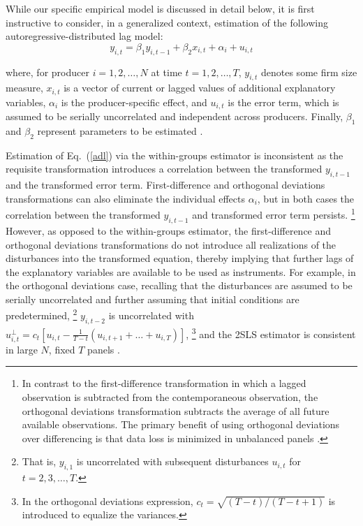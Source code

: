\documentclass[english]{article}
\begin{document}
While our specific empirical model is discussed in detail below, it is first 
instructive to consider, in a generalized context, estimation of the following 
autoregressive-distributed lag model: 
\begin{equation}
y_{i,t} = \beta_1 y_{i,t-1} + \beta_2 x_{i,t} + \alpha_i +  u_{i,t}
\label{adl}
\end{equation}

\noindent
where, for producer $i=1,2,\ldots,N$ at time $t=1,2,\ldots,T$, $y_{i,t}$ 
denotes some firm size measure, $x_{i,t}$ is a vector of current or lagged 
values of additional explanatory variables, $\alpha_i$ is the producer-specific 
effect, and $u_{i,t}$ is the error term, which is assumed to be serially 
uncorrelated and independent across producers. 
Finally, $\beta_1$ and $\beta_2$ represent parameters to be estimated
\citep{bond2002}.

Estimation of Eq.\ (\ref{adl}) via the within-groups estimator is 
inconsistent as the requisite transformation introduces a correlation between 
the transformed $y_{i,t-1}$ and the transformed error term. 
First-difference and orthogonal deviations transformations can also eliminate 
the individual effects $\alpha_i$, but in both cases the correlation between the 
transformed $y_{i,t-1}$ and transformed error term persists.%
\footnote{In contrast to the first-difference transformation in which a lagged 
observation is subtracted from the contemporaneous observation, the 
orthogonal deviations transformation subtracts the average of all future 
available observations. 
The primary benefit of using orthogonal deviations over differencing is that 
data loss is minimized in unbalanced panels \citep{arellano1995}.} 
However, as opposed to the within-groups estimator, the first-difference and 
orthogonal deviations transformations do not introduce all realizations of the 
disturbances into the transformed equation, thereby implying that further lags 
of the explanatory variables are available to be used as instruments. 
For example, in the orthogonal deviations case, recalling that the disturbances 
are assumed to be serially uncorrelated and further assuming that initial 
conditions are predetermined,%
\footnote{That is, $y_{i,1}$ is uncorrelated with subsequent disturbances 
$u_{i,t}$ for $t=2,3,\ldots,T$.} 
$y_{i,t-2}$ is uncorrelated with $u_{i,t}^{\perp} = c_t\left[u_{i,t} - 
\frac{1}{T - t }\left(u_{i,t + 1} + \ldots + u_{i,T} \right) \right]$,%
\footnote{In the orthogonal deviations expression, $c_t = 
\sqrt{(T - t)/(T - t + 1)}$ is introduced to equalize the variances.} 
and the 2SLS estimator is consistent in large $N$, fixed $T$ panels 
\citep{anderson1982, arellano1995, bond2002, roodman2009}.
\end{document}
